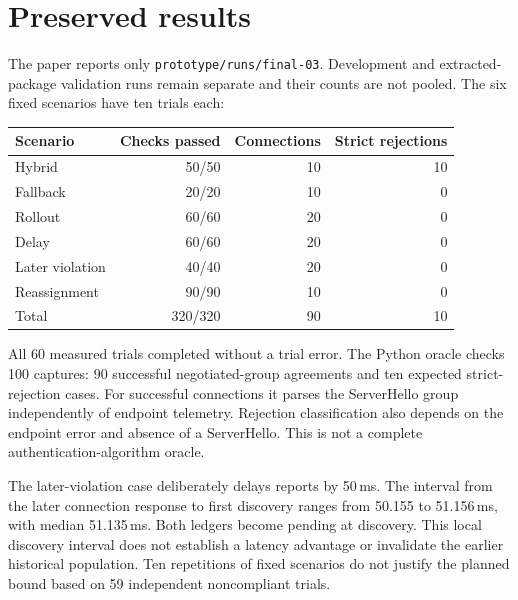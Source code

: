 \documentclass[10pt,a4paper]{article}
\begin{document}
\section{Preserved results}
The paper reports only \texttt{prototype/runs/final-03}. Development and extracted-package validation runs remain separate and their counts are not pooled. The six fixed scenarios have ten trials each:
\begin{center}
\begin{tabular}{lrrr}
\toprule
Scenario & Checks passed & Connections & Strict rejections\\
\midrule
Hybrid & 50/50 & 10 & 10\\
Fallback & 20/20 & 10 & 0\\
Rollout & 60/60 & 20 & 0\\
Delay & 60/60 & 20 & 0\\
Later violation & 40/40 & 20 & 0\\
Reassignment & 90/90 & 10 & 0\\
\midrule
Total & 320/320 & 90 & 10\\
\bottomrule
\end{tabular}
\end{center}
All 60 measured trials completed without a trial error. The Python oracle checks 100 captures: 90 successful negotiated-group agreements and ten expected strict-rejection cases. For successful connections it parses the ServerHello group independently of endpoint telemetry. Rejection classification also depends on the endpoint error and absence of a ServerHello. This is not a complete authentication-algorithm oracle.

The later-violation case deliberately delays reports by 50\,ms. The interval from the later connection response to first discovery ranges from 50.155 to 51.156\,ms, with median 51.135\,ms. Both ledgers become pending at discovery. This local discovery interval does not establish a latency advantage or invalidate the earlier historical population. Ten repetitions of fixed scenarios do not justify the planned bound based on 59 independent noncompliant trials.
\end{document}

